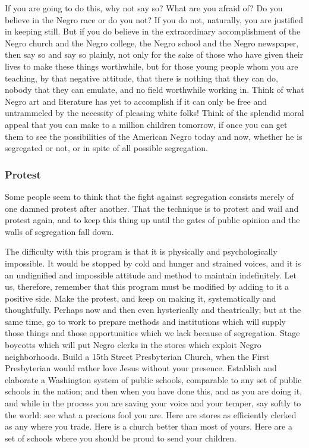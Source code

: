 \documentclass[letterpaper,10pt,english]{jupyterBook}
\begin{document}
\sphinxAtStartPar
If you are going to do this, why not say so? What are you afraid of? Do you believe in the Negro race or do you not? If you do not, naturally, you are justified in keeping still. But if you do believe in the extraordinary accomplishment of the Negro church and the Negro college, the Negro school and the Negro newspaper, then say so and say so plainly, not only for the sake of those who have given their lives to make these things worthwhile, but for those young people whom you are teaching, by that negative attitude, that there is nothing that they can do, nobody that they can emulate, and no field worthwhile working in. Think of what Negro art and literature has yet to accomplish if it can only be free and untrammeled by the necessity of pleasing white folks! Think of the splendid moral appeal that you can make to a million children tomorrow, if once you can get them to see the possibilities of the American Negro today and now, whether he is segregated or not, or in spite of all possible segregation.


\subsubsection{Protest}
\label{\detokenize{Volumes/41/06/counsels_of_despair:protest}}
\sphinxAtStartPar
Some people seem to think that the fight against segregation consists merely of one damned protest after another. That the technique is to protest and wail and protest again, and to keep this thing up until the gates of public opinion and the walls of segregation fall down.

\sphinxAtStartPar
The difficulty with this program is that it is physically and psychologically impossible. It would be stopped by cold and hunger and strained voices, and it is an undignified and impossible attitude and method to maintain indefinitely. Let us, therefore, remember that this program must be modified by adding to it a positive side. Make the protest, and keep on making it, systematically and thoughtfully. Perhaps now and then even hysterically and theatrically; but at the same time, go to work to prepare methods and institutions which will supply those things and those opportunities which we lack because of segregation. Stage boycotts which will put Negro clerks in the stores which exploit Negro neighborhoods. Build a 15th Street Presbyterian Church, when the First Presbyterian would rather love Jesus without your presence. Establish and elaborate a Washington system of public schools, comparable to any set of public schools in the nation; and then when you have done this, and as you are doing it, and while in the process you are saving your voice and your temper, say softly to the world: see what a precious fool you are. Here are stores as efficiently clerked as any where you trade. Here is a church better than most of yours. Here are a set of schools where you should be proud to send your children.
\end{document}

